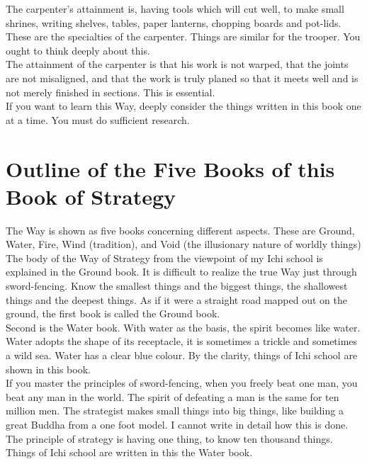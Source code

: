 The carpenter's attainment is, having tools which will cut well, to make small shrines, writing shelves, tables, paper lanterns, chopping boards and pot-lids. These are the specialties of the carpenter. Things are similar for the trooper. You ought to think deeply about this.\\

The attainment of the carpenter is that his work is not warped, that the joints are not misaligned, and that the work is truly planed so that it meets well and is not merely finished in sections. This is essential.\\

If you want to learn this Way, deeply consider the things written in this book one at a time. You must do sufficient research.\\
\section{Outline of the Five Books of this Book of Strategy}

The Way is shown as five books concerning different aspects. These are Ground, Water, Fire, Wind (tradition), and Void (the illusionary nature of worldly things)\\

The body of the Way of Strategy from the viewpoint of my Ichi school is explained in the Ground book. It is difficult to realize the true Way just through sword-fencing. Know the smallest things and the biggest things, the shallowest things and the deepest things. As if it were a straight road mapped out on the ground, the first book is called the Ground book.\\

Second is the Water book. With water as the basis, the spirit becomes like water. Water adopts the shape of its receptacle, it is sometimes a trickle and sometimes a wild sea. Water has a clear blue colour. By the clarity, things of Ichi school are shown in this book.\\

If you master the principles of sword-fencing, when you freely beat one man, you beat any man in the world. The spirit of defeating a man is the same for ten million men. The strategist makes small things into big things, like building a great Buddha from a one foot model. I cannot write in detail how this is done. The principle of strategy is having one thing, to know ten thousand things. Things of Ichi school are written in this the Water book.\\

